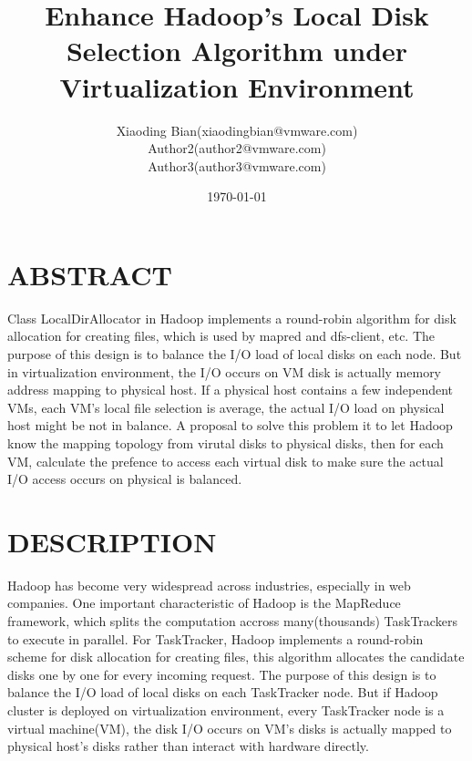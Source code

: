 \documentclass[11pt,a4paper]{article}
\begin{document}
\title{\color{blue}\textbf{Enhance Hadoop's Local Disk Selection Algorithm under Virtualization Environment}}
\author{\small Xiaoding Bian(xiaodingbian@vmware.com)\\
\small Author2(author2@vmware.com)\\
\small Author3(author3@vmware.com)\\
}
\date{\today}
\maketitle

\section{\textbf\normalsize{ABSTRACT}}

    
Class LocalDirAllocator in Hadoop implements a round-robin algorithm for
disk allocation for creating files, which is used by mapred and dfs-client,
etc. The purpose of this design is to balance the I/O load of local disks
on each node. But in virtualization environment, the I/O occurs on VM disk
is actually memory address mapping to physical host. If a physical host
contains a few independent VMs, each VM's local file selection is average,
the actual I/O load on physical host might be not in balance. 
A proposal to solve this problem it to let Hadoop know the mapping topology
from virutal disks to physical disks, then for each VM, calculate the prefence
to access each virtual disk to make sure the actual I/O access occurs on physical is balanced. 

\section{\textbf\normalsize{DESCRIPTION}}

Hadoop has become very widespread across industries, 
especially in web companies. One important characteristic of Hadoop is 
the MapReduce framework, which splits the computation accross 
many(thousands) TaskTrackers to execute in parallel. For TaskTracker,
Hadoop implements a round-robin scheme for disk allocation for 
creating files, this algorithm allocates the candidate disks one by 
one for every incoming request. The purpose of this design is to balance 
the I/O load of local disks on each TaskTracker node. But if 
Hadoop cluster is deployed on virtualization environment, every TaskTracker node is 
a virtual machine(VM), the disk I/O occurs on VM's disks is actually 
mapped to physical host's disks rather than interact with hardware directly.
\end{document}
